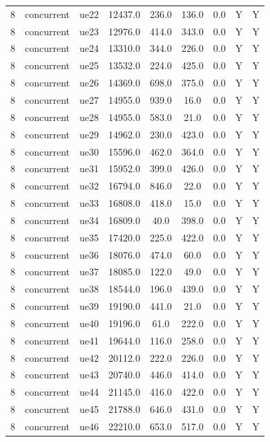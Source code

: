 \begin{table}[ht]
\begin{tabular}{|c|c|c|c|c|c|c|c|c|}
8 & concurrent & ue22 & 12437.0 & 236.0 & 136.0 & 0.0 & Y & Y \\
8 & concurrent & ue23 & 12976.0 & 414.0 & 343.0 & 0.0 & Y & Y \\
8 & concurrent & ue24 & 13310.0 & 344.0 & 226.0 & 0.0 & Y & Y \\
8 & concurrent & ue25 & 13532.0 & 224.0 & 425.0 & 0.0 & Y & Y \\
8 & concurrent & ue26 & 14369.0 & 698.0 & 375.0 & 0.0 & Y & Y \\
8 & concurrent & ue27 & 14955.0 & 939.0 & 16.0 & 0.0 & Y & Y \\
8 & concurrent & ue28 & 14955.0 & 583.0 & 21.0 & 0.0 & Y & Y \\
8 & concurrent & ue29 & 14962.0 & 230.0 & 423.0 & 0.0 & Y & Y \\
8 & concurrent & ue30 & 15596.0 & 462.0 & 364.0 & 0.0 & Y & Y \\
8 & concurrent & ue31 & 15952.0 & 399.0 & 426.0 & 0.0 & Y & Y \\
8 & concurrent & ue32 & 16794.0 & 846.0 & 22.0 & 0.0 & Y & Y \\
8 & concurrent & ue33 & 16808.0 & 418.0 & 15.0 & 0.0 & Y & Y \\
8 & concurrent & ue34 & 16809.0 & 40.0 & 398.0 & 0.0 & Y & Y \\
8 & concurrent & ue35 & 17420.0 & 225.0 & 422.0 & 0.0 & Y & Y \\
8 & concurrent & ue36 & 18076.0 & 474.0 & 60.0 & 0.0 & Y & Y \\
8 & concurrent & ue37 & 18085.0 & 122.0 & 49.0 & 0.0 & Y & Y \\
8 & concurrent & ue38 & 18544.0 & 196.0 & 439.0 & 0.0 & Y & Y \\
8 & concurrent & ue39 & 19190.0 & 441.0 & 21.0 & 0.0 & Y & Y \\
8 & concurrent & ue40 & 19196.0 & 61.0 & 222.0 & 0.0 & Y & Y \\
8 & concurrent & ue41 & 19644.0 & 116.0 & 258.0 & 0.0 & Y & Y \\
8 & concurrent & ue42 & 20112.0 & 222.0 & 226.0 & 0.0 & Y & Y \\
8 & concurrent & ue43 & 20740.0 & 446.0 & 414.0 & 0.0 & Y & Y \\
8 & concurrent & ue44 & 21145.0 & 416.0 & 422.0 & 0.0 & Y & Y \\
8 & concurrent & ue45 & 21788.0 & 646.0 & 431.0 & 0.0 & Y & Y \\
8 & concurrent & ue46 & 22210.0 & 653.0 & 517.0 & 0.0 & Y & Y \\

\end{tabular}
\end{table}
